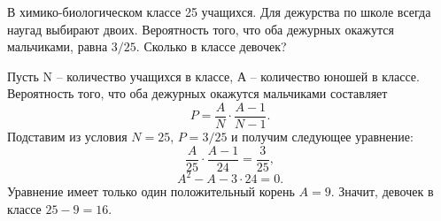 
В химико-биологическом классе 25 учащихся. 
Для дежурства по школе всегда наугад выбирают двоих. 
Вероятность того, что оба дежурных окажутся мальчиками, равна $3/25$. Сколько в классе девочек?

\soultionSection

Пусть N -- количество учащихся в классе, А -- количество юношей в классе. Вероятность того, что оба дежурных окажутся мальчиками составляет 
$$P = \frac{A}{N}\cdot \frac{A - 1}{N - 1}.$$
Подставим из условия $N = 25$, $P = 3/25$ и получим следующее уравнение:
$$\frac{A}{25}\cdot\frac{A - 1}{24} = \frac{3}{25},$$
$$A^2 - A - 3 \cdot 24 = 0.$$
Уравнение имеет только один положительный корень $A = 9$. Значит, девочек в классе $25 - 9 = 16$.

